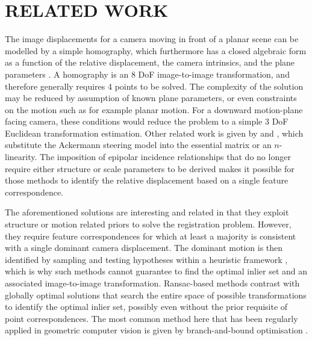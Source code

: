 \documentclass[letterpaper, 10 pt, conference]{ieeeconf}  %
\begin{document}

\section{RELATED WORK}
\label{sec:related_work}

The image displacements for a camera moving in front of a planar scene can be modelled by a simple homography, which furthermore has a closed algebraic form as a function of the relative displacement, the camera intrinsics, and the plane parameters \cite{hartley2003multiple,ma2012invitation}. A homography is an 8 DoF image-to-image transformation, and therefore generally requires 4 points to be solved. The complexity of the solution may be reduced by assumption of known plane parameters, or even constraints on the motion such as for example planar motion. For a downward motion-plane facing camera, these conditions would reduce the problem to a simple 3 DoF Euclidean transformation estimation. Other related work is given by \cite{scaramuzza2009real} and \cite{huang2019motion}, which substitute the Ackermann steering model into the essential matrix or an $n$-linearity. The imposition of epipolar incidence relationships that do no longer require either structure or scale parameters to be derived makes it possible for those methods to identify the relative displacement based on a single feature correspondence.

The aforementioned solutions are interesting and related in that they exploit structure or motion related priors to solve the registration problem. However, they require feature correspondences for which at least a majority is consistent with a single dominant camera displacement. The dominant motion is then identified by sampling and testing hypotheses within a heuristic framework \cite{fischler81}, which is why such methods cannot guarantee to find the optimal inlier set and an associated image-to-image transformation. Ransac-based methods contrast with globally optimal solutions that search the entire space of possible transformations to identify the optimal inlier set, possibly even without the prior requisite of point correspondences. The most common method here that has been regularly applied in geometric computer vision is given by branch-and-bound optimisation \cite{land2010automatic}.
\end{document}
